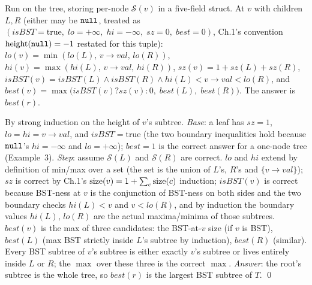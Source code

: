 Run  on the tree, storing per-node $\mathcal S(v)$ in a
five-field struct. At $v$ with children $L,R$ (either may be $\texttt{null}$, treated
as $(\mathit{isBST}{=}\text{true},\;\mathit{lo}{=}+\infty,\;\mathit{hi}{=}-\infty,\;\mathit{sz}{=}0,\;\mathit{best}{=}0)$,
Ch.1's convention $\operatorname{height}(\texttt{null})=-1$ restated for this tuple):
$\mathit{lo}(v)=\min(\mathit{lo}(L),\,v\!\to\!\mathit{val},\,\mathit{lo}(R))$,
$\mathit{hi}(v)=\max(\mathit{hi}(L),\,v\!\to\!\mathit{val},\,\mathit{hi}(R))$,
$\mathit{sz}(v)=1+\mathit{sz}(L)+\mathit{sz}(R)$,
$\mathit{isBST}(v)=\mathit{isBST}(L)\wedge\mathit{isBST}(R)\wedge\mathit{hi}(L)<v\!\to\!\mathit{val}<\mathit{lo}(R)$,
and $\mathit{best}(v)=\max\big(\mathit{isBST}(v)?\mathit{sz}(v):0,\;\mathit{best}(L),\;\mathit{best}(R)\big)$.
The answer is $\mathit{best}(r)$.

\begin{proofbox}
By strong induction on the height of $v$'s subtree. \emph{Base}: a leaf has
$\mathit{sz}{=}1$, $\mathit{lo}{=}\mathit{hi}{=}v\!\to\!\mathit{val}$, and
$\mathit{isBST}{=}\text{true}$ (the two boundary inequalities hold because
$\texttt{null}$'s $\mathit{hi}=-\infty$ and $\mathit{lo}=+\infty$); $\mathit{best}{=}1$
is the correct answer for a one-node tree (Example~3). \emph{Step}: assume
$\mathcal S(L)$ and $\mathcal S(R)$ are correct. $\mathit{lo}$ and
$\mathit{hi}$ extend by definition of min/max over a set (the set is the
union of $L$'s, $R$'s and $\{v\!\to\!\mathit{val}\}$); $\mathit{sz}$ is
correct by Ch.1's $\operatorname{size}(v)=1+\sum_c\operatorname{size}(c)$ induction;
$\mathit{isBST}(v)$ is correct because BST-ness at $v$ is the conjunction of
BST-ness on both sides and the two boundary checks $\mathit{hi}(L)<v$ and
$v<\mathit{lo}(R)$, and by induction the boundary values $\mathit{hi}(L)$,
$\mathit{lo}(R)$ are the actual maxima/minima of those subtrees.
$\mathit{best}(v)$ is the max of three candidates: the BST-at-$v$ size
(if $v$ is BST), $\mathit{best}(L)$ (max BST strictly inside $L$'s subtree
by induction), $\mathit{best}(R)$ (similar). Every BST subtree of $v$'s
subtree is either exactly $v$'s subtree or lives entirely inside $L$ or
$R$; the $\max$ over these three is the correct $\max$. \emph{Answer}: the
root's subtree is the whole tree, so $\mathit{best}(r)$ is the largest BST
subtree of $T$. \qed
\end{proofbox}

